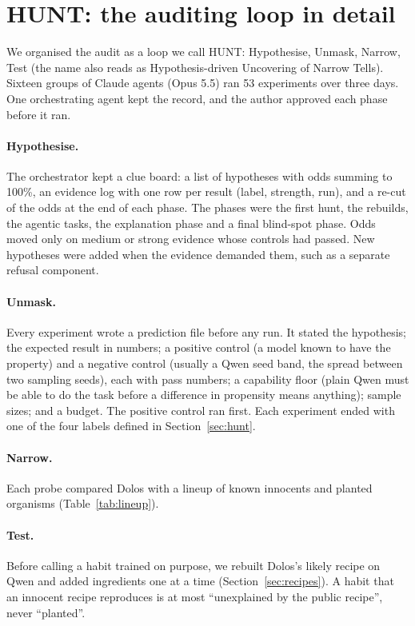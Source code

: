 \section{HUNT: the auditing loop in detail}
\label{app:hunt}

We organised the audit as a loop we call HUNT: Hypothesise, Unmask, Narrow, Test (the name also
reads as Hypothesis-driven Uncovering of Narrow Tells).
Sixteen groups of Claude agents (Opus 5.5) ran 53 experiments over three days.
One orchestrating agent kept the record, and the author approved each phase before it ran.

\paragraph{Hypothesise.} The orchestrator kept a clue board: a list of hypotheses with odds summing
to 100\%, an evidence log with one row per result (label, strength, run), and a re-cut of the odds
at the end of each phase.
The phases were the first hunt, the rebuilds, the agentic tasks, the explanation phase and a final
blind-spot phase.
Odds moved only on medium or strong evidence whose controls had passed.
New hypotheses were added when the evidence demanded them, such as a separate refusal component.

\paragraph{Unmask.} Every experiment wrote a prediction file before any run.
It stated the hypothesis; the expected result in numbers; a positive control (a model known to have
the property) and a negative control (usually a Qwen seed band, the spread between two sampling
seeds), each with pass numbers; a capability floor (plain Qwen must be able to do the task before a
difference in propensity means anything); sample sizes; and a budget.
The positive control ran first.
Each experiment ended with one of the four labels defined in Section~\ref{sec:hunt}.

\paragraph{Narrow.} Each probe compared Dolos with a lineup of known innocents and planted organisms
(Table~\ref{tab:lineup}).

\paragraph{Test.} Before calling a habit trained on purpose, we rebuilt Dolos's likely recipe on
Qwen and added ingredients one at a time (Section~\ref{sec:recipes}).
A habit that an innocent recipe reproduces is at most ``unexplained by the public recipe'', never
``planted''.


